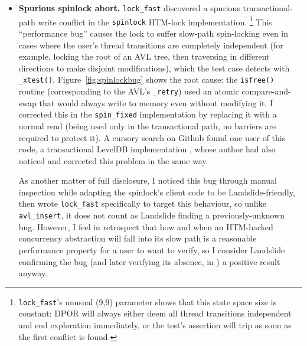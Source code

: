 \begin{itemize}
	As a matter of full disclosure,
	I noted that the loop does not affect the test's possible behaviours,
	only its {\em likely} ones,
	and so removed it to make the test more Landslide-friendly.
	To dispel any doubt about bias or test hacking,
	I confirmed that Landslide still finds the bug with the spin loop unmodified,
	on (3,1) in the same 53 interleavings,
	although it suffers resource exhaustion
	on parameters of (2,2) or greater.
	\item
	{\bf Spurious spinlock abort.}
	{\tt lock\_fast} discovered a spurious transactional-path write conflict
	in the {\tt spinlock} HTM-lock implementation.%
	\footnote{{\tt lock\_fast}'s unusual (9,9) parameter shows that this state space size is constant: %
	DPOR will always either deem all thread transitions independent and end exploration immediately,
	or the test's assertion will trip as soon as the first conflict is found.}
	This ``performance bug'' causes the lock to suffer slow-path spin-locking
	even in cases where the user's thread transitions are completely independent
	(for example, locking the root of an AVL tree,
	then traversing in different directions to make disjoint modifications),
	which the test case detects with {\tt \_xtest()}.
	Figure~\ref{fig:spinlockbug} shows the root cause:
	the {\tt isfree()} routine (corresponding to the AVL's {\tt \_retry})
	used an atomic compare-and-swap that would always write to memory even without modifying it.
	I corrected this in the {\tt spin\_fixed} implementation by replacing it
	with a normal read
	(being used only in the transactional path, no barriers are required to protect it).
	A cursory search on Github found one user of this code,
	a transactional LevelDB implementation \cite{htm-leveldb-github},
	whose author had also noticed and corrected this problem in the same way.

	As another matter of full disclosure,
	I noticed this bug through manual inspection
	while adapting the spinlock's client code to be Landslide-friendly,
	then wrote {\tt lock\_fast} specifically to target this behaviour,
	so unlike {\tt avl\_insert}, it does not count as Landslide finding a previously-unknown bug.
	However, I feel in retrospect that how and when
	an HTM-backed concurrency abstraction
	will fall into its slow path
	is a reasonable performance property for a user to want to verify,
	so I consider Landslide confirming the bug (and later verifying its absence, in \sect{\ref{sec:tm-verif}})
	a positive result anyway.
\end{itemize}


